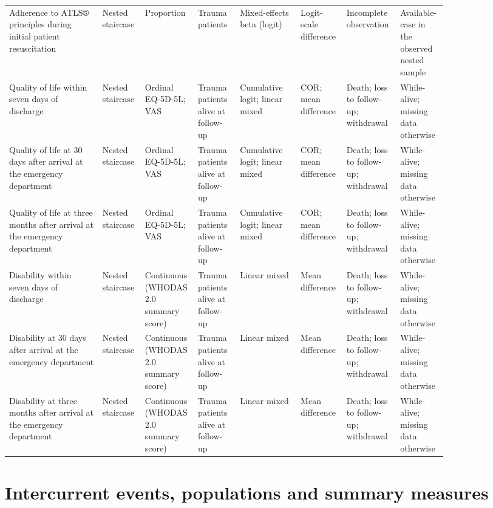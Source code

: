 \documentclass[
]{scrartcl}
\begin{document}
\begin{landscape}
\begin{longtable}{p{0.2\linewidth}p{0.08\linewidth}p{0.07\linewidth}p{0.09\linewidth}p{0.13\linewidth}p{0.08\linewidth}p{0.1\linewidth}p{0.09\linewidth}}
\addlinespace
Adherence to ATLS® principles during initial patient resuscitation & Nested staircase & Proportion & Trauma patients & Mixed-effects beta (logit) & Logit-scale difference & Incomplete observation & Available-case in the observed nested sample\\
Quality of life within seven days of discharge & Nested staircase & Ordinal EQ-5D-5L; VAS & Trauma patients alive at follow-up & Cumulative logit; linear mixed & COR; mean difference & Death; loss to follow-up; withdrawal & While-alive; missing data otherwise\\
Quality of life at 30 days after arrival at the emergency department & Nested staircase & Ordinal EQ-5D-5L; VAS & Trauma patients alive at follow-up & Cumulative logit; linear mixed & COR; mean difference & Death; loss to follow-up; withdrawal & While-alive; missing data otherwise\\
Quality of life at three months after arrival at the emergency department & Nested staircase & Ordinal EQ-5D-5L; VAS & Trauma patients alive at follow-up & Cumulative logit; linear mixed & COR; mean difference & Death; loss to follow-up; withdrawal & While-alive; missing data otherwise\\
Disability within seven days of discharge & Nested staircase & Continuous (WHODAS 2.0 summary score) & Trauma patients alive at follow-up & Linear mixed & Mean difference & Death; loss to follow-up; withdrawal & While-alive; missing data otherwise\\
\addlinespace
Disability at 30 days after arrival at the emergency department & Nested staircase & Continuous (WHODAS 2.0 summary score) & Trauma patients alive at follow-up & Linear mixed & Mean difference & Death; loss to follow-up; withdrawal & While-alive; missing data otherwise\\
Disability at three months after arrival at the emergency department & Nested staircase & Continuous (WHODAS 2.0 summary score) & Trauma patients alive at follow-up & Linear mixed & Mean difference & Death; loss to follow-up; withdrawal & While-alive; missing data otherwise\\*

\end{longtable}

\endgroup{}\end{landscape}
\restoregeometry

\section{Intercurrent events, populations and summary
measures}\label{sec-intercurrent-events-populations-and-summary-measures}
\end{document}
